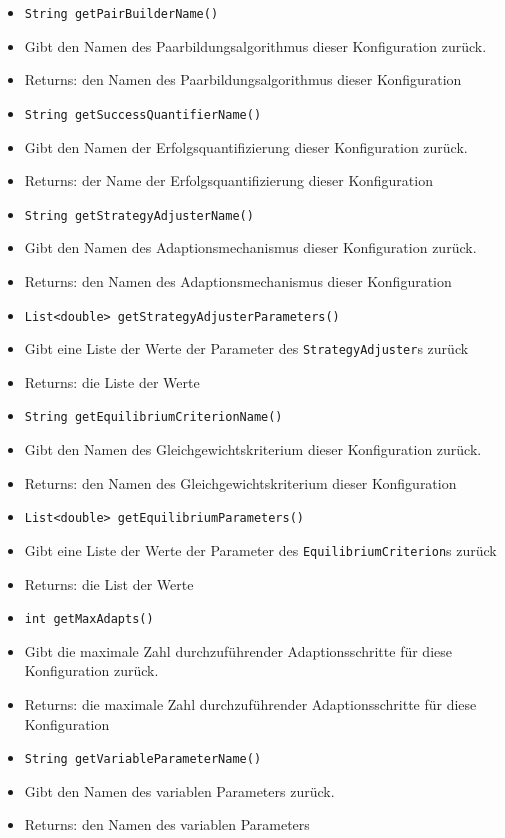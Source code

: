 \documentclass[parskip=full,11pt]{scrartcl}
\begin{document}
\begin{itemize}
	\item \texttt{String getPairBuilderName()}
	\item[] Gibt den Namen des  Paarbildungsalgorithmus dieser Konfiguration zurück.
	\item[] Returns: den Namen des Paarbildungsalgorithmus dieser Konfiguration
	
	\item \texttt{String getSuccessQuantifierName()}
	\item[] Gibt den Namen der Erfolgsquantifizierung dieser Konfiguration zurück.
	\item[] Returns: der Name der Erfolgsquantifizierung dieser Konfiguration
	
	\item \texttt{String getStrategyAdjusterName()}
	\item[] Gibt den Namen des Adaptionsmechanismus dieser Konfiguration zurück.
	\item[] Returns: den Namen des Adaptionsmechanismus dieser Konfiguration
	
	\item \texttt{List<double> getStrategyAdjusterParameters()}
	\item[] Gibt eine Liste der Werte der Parameter des \texttt{StrategyAdjuster}s zurück
	\item[] Returns: die Liste der Werte

	
	\item \texttt{String getEquilibriumCriterionName()}
	\item[] Gibt den Namen des  Gleichgewichtskriterium dieser Konfiguration zurück.
	\item[] Returns: den Namen des Gleichgewichtskriterium dieser Konfiguration
	
	\item \texttt{List<double> getEquilibriumParameters()}
	\item[] Gibt eine Liste der Werte der Parameter des \texttt{EquilibriumCriterion}s zurück
	\item[] Returns: die List der Werte
	
	\item \texttt{int getMaxAdapts()}
	\item[] Gibt die maximale Zahl durchzuführender Adaptionsschritte für diese Konfiguration zurück.
	\item[] Returns: die maximale Zahl durchzuführender Adaptionsschritte für diese Konfiguration
	
	\item \texttt{String getVariableParameterName()}
	\item[] Gibt den Namen des variablen Parameters zurück.
	\item[] Returns: den Namen des variablen Parameters
	

\end{itemize}
\end{document}
